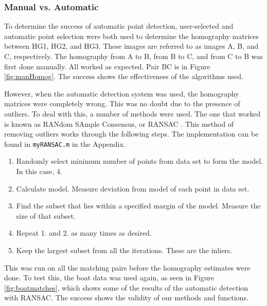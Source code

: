 \documentclass[a4paper, 10pt, conference]{ieeeconf}
\begin{document}
\subsubsection{Manual vs. Automatic}
To determine the success of automatic point detection, user-selected and automatic point selection were both used to determine the homography matrices between HG1, HG2, and HG3. These images are referred to as images A, B, and C, respectively. The homography from A to B, from B to C, and from C to B was first done manually. All worked as expected. Pair BC is in Figure \ref{fig:manHomog}. The success shows the effectiveness of the algorithms used.

However, when the automatic detection system was used, the homography matrices were completely wrong. This was no doubt due to the presence of outliers. To deal with this, a number of methods were used. The one that worked is known as RANdom SAmple Consensus, or RANSAC \cite{ransac}. This method of removing outliers works through the following steps. The implementation can be found in \texttt{myRANSAC.m} in the Appendix.
\begin{enumerate}
    \item Randomly select minimum number of points from data set to form the model. In this case, 4.
    \item Calculate model. Measure deviation from model of each point in data set.
    \item Find the subset that lies within a specified margin of the model. Measure the size of that subset.
    \item Repeat 1. and 2. as many times as desired.
    \item Keep the largest subset from all the iterations. These are the inliers.
\end{enumerate}
This was run on all the matching pairs before the homography estimates were done. To test this, the boat data was used again, as seen in Figure \ref{fig:boatmatches}, which shows some of the results of the automatic detection with RANSAC. The success shows the validity of our methods and functions.
\end{document}
